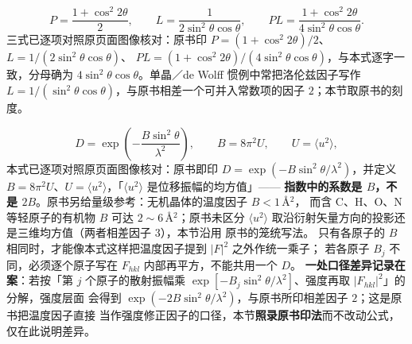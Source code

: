 \begin{equation}
P=\frac{1+\cos^{2}2\theta}{2},\qquad
L=\frac{1}{2\sin^{2}\theta\cos\theta},\qquad
PL=\frac{1+\cos^{2}2\theta}{4\sin^{2}\theta\cos\theta}.
\label{eq:ch04b-PL}
\end{equation}
三式已逐项对照原页面图像核对：原书印
$P=(1+\cos^{2}2\theta)/2$、$L=1/(2\sin^{2}\theta\cos\theta)$、
$PL=(1+\cos^{2}2\theta)/(4\sin^{2}\theta\cos\theta)$，与本式逐字一致，分母确为
$4\sin^{2}\theta\cos\theta$。单晶／de Wolff 惯例中常把洛伦兹因子写作
$L=1/(\sin^{2}\theta\cos\theta)$，与原书相差一个可并入常数项的因子 $2$；本节取原书的刻度。

\begin{equation}
D=\exp\!\left(-\frac{B\sin^{2}\theta}{\lambda^{2}}\right),\qquad B=8\pi^{2}U,\qquad U=\langle u^{2}\rangle ,
\label{eq:ch04b-DW}
\end{equation}
本式已逐项对照原页面图像核对：原书即印 $D=\exp(-B\sin^{2}\theta/\lambda^{2})$，并定义
$B=8\pi^{2}U$、$U=\langle u^{2}\rangle$，「$\langle u^{2}\rangle$ 是位移振幅的均方值」——
\textbf{指数中的系数是 $B$，不是 $2B$}。原书另给量级参考：无机晶体的温度因子 $B<1$\,\AA$^{2}$，
而含 C、H、O、N 等轻原子的有机物 $B$ 可达 $2\sim6$\,\AA$^{2}$；原书未区分
$\langle u^{2}\rangle$ 取沿衍射矢量方向的投影还是三维均方值（两者相差因子 $3$），本节沿用
原书的笼统写法。
只有各原子的 $B$ 相同时，才能像本式这样把温度因子提到 $\left|F\right|^{2}$ 之外作统一乘子；
若各原子 $B_{j}$ 不同，必须逐个原子写在 $F_{hkl}$ 内部再平方，不能共用一个 $D$。
\textbf{一处口径差异记录在案}：若按「第 $j$ 个原子的散射振幅乘
$\exp[-B_{j}\sin^{2}\theta/\lambda^{2}]$、强度再取 $\left|F_{hkl}\right|^{2}$」的分解，强度层面
会得到 $\exp(-2B\sin^{2}\theta/\lambda^{2})$，与原书所印相差因子 $2$；这是原书把温度因子直接
当作强度修正因子的口径，本节\textbf{照录原书印法}而不改动公式，仅在此说明差异。

